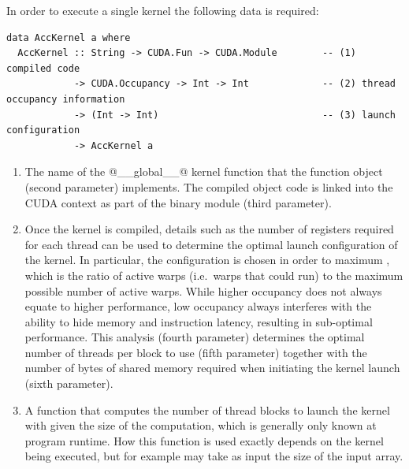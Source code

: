 In order to execute a single kernel the following data is required:
%
\begin{lstlisting}[style=haskell]
data AccKernel a where
  AccKernel :: String -> CUDA.Fun -> CUDA.Module        -- (1) compiled code
            -> CUDA.Occupancy -> Int -> Int             -- (2) thread occupancy information
            -> (Int -> Int)                             -- (3) launch configuration
            -> AccKernel a
\end{lstlisting}
%
\begin{enumerate}
\item The name of the @\_\_global\_\_@ kernel function that the function
    object (second parameter) implements. The compiled object code is linked
    into the CUDA context as part of the binary module (third parameter).

\item Once the kernel is compiled, details such as the number of registers
    required for each thread can be used to determine the optimal launch
    configuration of the kernel. In particular, the configuration is chosen in
    order to maximum , which is the ratio of active
    warps (i.e.\ warps that could run) to the maximum possible number of active
    warps. While higher occupancy does not always equate to higher performance,
    low occupancy always interferes with the ability to hide memory and
    instruction latency, resulting in sub-optimal performance. This analysis
    (fourth parameter) determines the optimal number of threads per block to use
    (fifth parameter) together with the number of bytes of shared memory
    required when initiating the kernel launch (sixth parameter).

\item A function that computes the number of thread blocks to launch the kernel
    with given the size of the computation, which is generally only known at
    program runtime. How this function is used exactly depends on the kernel
    being executed, but for example may take as input the size of the input
    array.
\end{enumerate}

